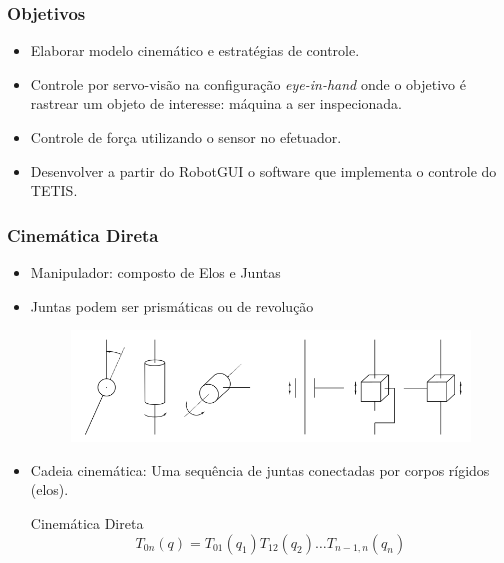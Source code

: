 \documentclass{beamer}
\begin{document}

\begin{frame}
\frametitle{Objetivos}
\begin{itemize}
\item Elaborar modelo cinemático e estratégias de controle. %
\item Controle por servo-visão na configuração \textit{eye-in-hand} onde o objetivo é rastrear um objeto de interesse: máquina a ser inspecionada.
\item Controle de força utilizando o sensor no efetuador.
\item Desenvolver a partir do RobotGUI o software que implementa o controle do TETIS. %
\end{itemize}
\end{frame}


\begin{frame}

\frametitle{Cinemática Direta} %
\begin{itemize}
\item Manipulador: composto de Elos e Juntas 
\item Juntas podem ser prismáticas ou de revolução
\begin{figure}
\includegraphics[width=0.8\linewidth]{./img/joints.png}
\end{figure}
\item Cadeia cinemática: Uma sequência de juntas conectadas por corpos rígidos (elos).
\begin{block}{Cinemática Direta}
\begin{equation} \label{eq:cinedireta}
{T}_{0n}({q}) = {T}_{01}(q_1) {T}_{12}(q_{2}) {\dots} {T}_{n-1,n}(q_n)
\end{equation}
\end{block}
\end{itemize}
\end{frame}
\end{document}
